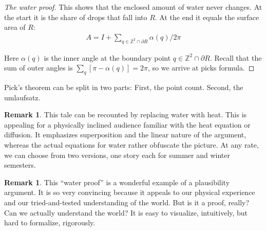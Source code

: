 \documentclass[a4paper]{amsart}
\numberwithin{equation}{section}
\theoremstyle{plain}
\theoremstyle{definition}
\newtheorem{remark}[theorem]{Remark}
\newcommand{\Z}{\mathbb{Z}}
\DeclareMathOperator{\vol}{vol}
\begin{document}
\begin{proof}[The water proof]
  This shows that the enclosed amount of water never changes.
  At the start it is the share of drops that fall into $R$.
  At the end it equals the surface area of $R$:
  \begin{align*}
    A = I + \sum_{q \in \Z^2 \cap \partial R} \alpha(q) / 2\pi
  \end{align*}

  Here $\alpha(q)$ is the inner angle at the boundary point $q \in \Z^2 \cap \partial R$.
  Recall that the sum of outer angles is $\sum_q [ \pi - \alpha(q) ] = 2\pi$,
  so we arrive at picks formula.
\end{proof}

Pick's theorem can be split in two parts:
First, the point count.
Second, the umlaufsatz.


\begin{remark}
  This tale can be recounted by replacing water with heat.
  This is appealing for a physically inclined audience
  familiar with the heat equation or diffusion.
  It emphasizes superposition and the linear nature of the argument,
  whereas the actual equations for water rather obfuscate the picture.
  At any rate, we can choose from two versions,
  one story each for summer and winter semesters.

\end{remark}

\begin{remark}
  This “water proof” is a wonderful example of a plausibility argument.
  It is so very convincing because it appeals to our physical experience
  and our tried-and-tested understanding of the world.  But is it a proof, really?
  Can we actually understand the world?
  It is easy to visualize, intuitively, but hard to formalize, rigorously.
\end{remark}




\end{document}

